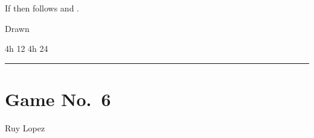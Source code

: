 \begin{multicols}{2}
\noindent
If  then follows  and .

\begin{center}
Drawn\\
\end{center} 
\noindent 4h 12 \hfill 4h 24 \\
\begin{center}
\vspace{-.75cm}\noindent\rule{3cm}{0.4pt}
\end{center}

\end{multicols}




\section{Game No.~6}
\begin{center}
Ruy Lopez \\
\end{center} 
